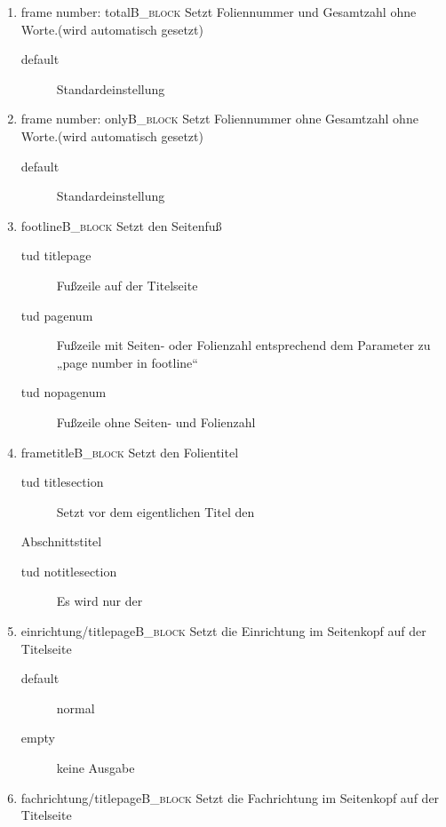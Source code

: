\documentclass[presentation,t]{beamer}
\begin{document}
\begin{enumerate}
\item frame number: total\hfill{}\textsc{B\_block}
\label{sec:orgbc0a072}
Setzt Foliennummer und Gesamtzahl ohne Worte.(wird automatisch gesetzt)
\begin{description}
\item[{default}] Standardeinstellung
\end{description}

\item frame number: only\hfill{}\textsc{B\_block}
\label{sec:org4c8ada9}
Setzt Foliennummer ohne  Gesamtzahl ohne Worte.(wird automatisch gesetzt)
\begin{description}
\item[{default}] Standardeinstellung
\end{description}


\item footline\hfill{}\textsc{B\_block}
\label{sec:org30f7399}
Setzt den Seitenfuß

\begin{description}
\item[{tud titlepage}] Fußzeile auf der Titelseite
\item[{tud pagenum}] Fußzeile mit Seiten- oder Folienzahl entsprechend dem
Parameter zu „page number in footline“
\item[{tud nopagenum}] Fußzeile ohne Seiten- und Folienzahl
\end{description}

\item frametitle\hfill{}\textsc{B\_block}
\label{sec:org257f2c0}
Setzt den Folientitel
\begin{description}
\item[{tud titlesection}] Setzt vor dem eigentlichen Titel den
\end{description}
Abschnittstitel
\begin{description}
\item[{tud notitlesection}] Es wird nur der
\end{description}

\item einrichtung/titlepage\hfill{}\textsc{B\_block}
\label{sec:orge9a3057}
Setzt die Einrichtung im Seitenkopf auf der Titelseite

\begin{description}
\item[{default}] normal
\item[{empty}] keine Ausgabe
\end{description}
\item fachrichtung/titlepage\hfill{}\textsc{B\_block}
\label{sec:org8d4f704}
Setzt die Fachrichtung im Seitenkopf auf der Titelseite


\end{enumerate}
\end{document}
